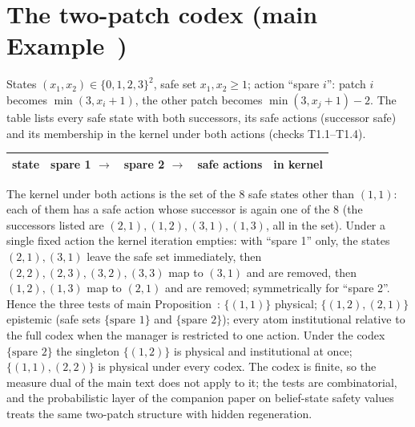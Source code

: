 \section{The two-patch codex (main Example~)}\label{si:patch}

States $(x_1,x_2)\in\{0,1,2,3\}^2$, safe set $x_1,x_2\ge1$; action ``spare $i$'': patch $i$ becomes $\min(3,x_i+1)$, the other patch becomes $\min(3,x_j+1)-2$. The table lists every safe state with both successors, its safe actions (successor safe) and its membership in the kernel under both actions (checks T1.1--T1.4).
\begin{center}\small
\begin{tabular}{ccccc}
\toprule
state & spare 1 $\to$ & spare 2 $\to$ & safe actions & in kernel\\
\midrule

\bottomrule
\end{tabular}
\end{center}
The kernel under both actions is the set of the $8$ safe states other than $(1,1)$: each of them has a safe action whose successor is again one of the $8$ (the successors listed are $(2,1),(1,2),(3,1),(1,3)$, all in the set). Under a single fixed action the kernel iteration empties: with ``spare 1'' only, the states $(2,1),(3,1)$ leave the safe set immediately, then $(2,2),(2,3),(3,2),(3,3)$ map to $(3,1)$ and are removed, then $(1,2),(1,3)$ map to $(2,1)$ and are removed; symmetrically for ``spare 2''. Hence the three tests of main Proposition~: $\{(1,1)\}$ physical; $\{(1,2),(2,1)\}$ epistemic (safe sets $\{\text{spare }1\}$ and $\{\text{spare }2\}$); every atom institutional relative to the full codex when the manager is restricted to one action. Under the codex $\{\text{spare }2\}$ the singleton $\{(1,2)\}$ is physical and institutional at once; $\{(1,1),(2,2)\}$ is physical under every codex. The codex is finite, so the measure dual of the main text does not apply to it; the tests are combinatorial, and the probabilistic layer of the companion paper on belief-state safety values treats the same two-patch structure with hidden regeneration.

